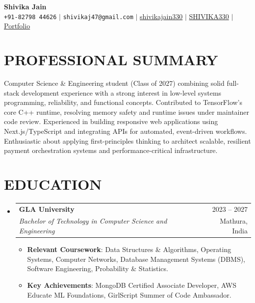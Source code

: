 \documentclass[letterpaper,11pt]{article}
\makeatletter
\newcommand{\resumeItem}[1]{
  \item\small{
    {#1 \vspace{-2pt}}
  }
}
\newcommand{\resumeSubheading}[4]{
  \vspace{-1pt}\item
    \begin{tabular*}{\textwidth}[t]{l@{\extracolsep{\fill}}r}
      \textbf{#1} & {\color{dark-grey}\small #2}\vspace{1pt}\\ 
      \textit{#3} & {\color{dark-grey} \small #4}\\ 
    \end{tabular*}\vspace{-4pt}
}
\newcommand{\resumeSubHeadingListStart}{\begin{itemize}[leftmargin=0in, label={}]}
\newcommand{\resumeSubHeadingListEnd}{\end{itemize}}
\newcommand{\resumeItemListStart}{\begin{itemize}[leftmargin=0.15in]}
\newcommand{\resumeItemListEnd}{\end{itemize}\vspace{-2pt}}
\makeatother
\begin{document}
\begin{center}
    \textbf{\Huge Shivika Jain} \\ \vspace{4pt}
    \small 
    \faPhone* \texttt{+91-82798 44626} \hspace{1pt} $|$
    \hspace{1pt} \faEnvelope \hspace{1pt} \texttt{shivikaj47@gmail.com} \hspace{1pt} $|$ 
    \hspace{1pt} \faLinkedin \hspace{1pt} \href{https://www.linkedin.com/in/shivikajain330/}{shivikajain330} \hspace{1pt} $|$
    \faGithub \hspace{1pt} \href{https://github.com/SHIVIKA330}{SHIVIKA330} \hspace{1pt} $|$
    \faGlobe \hspace{1pt} \href{https://portfolio-ohp1.onrender.com}{Portfolio}
    \\ \vspace{-4pt}
\end{center}

\section{PROFESSIONAL SUMMARY}
  \small{
Computer Science \& Engineering student (Class of 2027) combining solid full-stack development experience with a strong interest in low-level systems programming, reliability, and functional concepts. Contributed to TensorFlow's core C++ runtime, resolving memory safety and runtime issues under maintainer code review. Experienced in building responsive web applications using Next.js/TypeScript and integrating APIs for automated, event-driven workflows. Enthusiastic about applying first-principles thinking to architect scalable, resilient payment orchestration systems and performance-critical infrastructure.
  }
\vspace{-4pt}

\section {EDUCATION}
  \resumeSubHeadingListStart
    \resumeSubheading
      {GLA University}{2023 -- 2027}
      {Bachelor of Technology in Computer Science and Engineering}{Mathura, India}
      	\resumeItemListStart
    	\resumeItem {\textbf{Relevant Coursework}: Data Structures \& Algorithms, Operating Systems, Computer Networks, Database Management Systems (DBMS), Software Engineering, Probability \& Statistics.}
        \resumeItem {\textbf{Key Achievements}: MongoDB Certified Associate Developer, AWS Educate ML Foundations, GirlScript Summer of Code Ambassador.}
        \resumeItemListEnd
  \resumeSubHeadingListEnd
\end{document}
